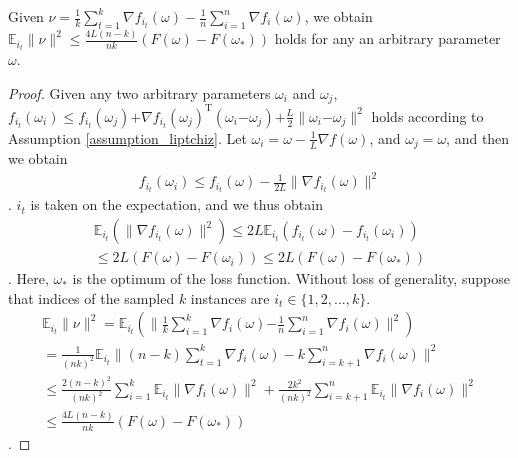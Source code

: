 \documentclass[letterpaper]{article}
\begin{document}
\begin{Lemma}
\label{lemma_nu}
Given $\nu = \frac{1}{k}\sum\limits_{t=1}^k  \nabla f_{i_t}(\omega) - \frac{1}{n}\sum\limits_{i=1}^n \nabla f_i(\omega)$, we obtain
$\mathbb{E}_{i_t}\parallel \nu  \parallel^2 \le \frac{4L(n-k)}{nk}\left(F(\omega) - F(\omega_\ast)\right)$ holds for any an arbitrary parameter $\omega$.
\end{Lemma}
\begin{proof}
Given any two arbitrary parameters $\omega_i$ and $\omega_j$,  $f_{i_t}(\omega_i)\le f_{i_t}(\omega_j)\mathrm{+}\nabla f_{i_t}(\omega_j)^\mathrm{T} (\omega_i\mathrm{-}\omega_j)\mathrm{+}\frac{L}{2}\parallel \omega_i\mathrm{-}\omega_j\parallel^2$ holds according to Assumption  \ref{assumption_liptchiz}. Let $\omega_i = \omega  - \frac{1}{L}\nabla f(\omega)$, and $\omega_j = \omega$, and then we obtain
\begin{equation}
\begin{array}{ll}
f_{i_t}(\omega_i) \le f_{i_t}(\omega)-\frac{1}{2L}\parallel  \nabla f_{i_t}(\omega)   \parallel^2
\end{array} 
\end{equation}.  $i_{t}$ is taken on the expectation, and we thus obtain
\begin{equation}
\begin{array}{ll}
\mathbb{E}_{i_t}\left(\parallel  \nabla f_{i_t}(\omega)   \parallel^2 \right) \le 2L \mathbb{E}_{i_t}\left( f_{i_t}(\omega) - f_{i_t}(\omega_i) \right)   \\
\le 2L (F(\omega) - F(\omega_i) )  \le 2L (F(\omega) - F(\omega_\ast))
\end{array} 
\end{equation}. Here, $\omega_\ast$ is the optimum of the loss function.   Without loss of generality, suppose that indices of the sampled $k$ instances are $i_t\in\{1,2, ..., k\}$.
\begin{equation}
\begin{array}{ll}
\mathbb{E}_{i_t}\parallel \nu  \parallel^2 
= \mathbb{E}_{i_t}\left( \parallel \frac{1}{k}\sum\limits_{i=1}^k  \nabla f_{i}(\omega) \mathrm{-} \frac{1}{n}\sum\limits_{i=1}^n \nabla f_i(\omega) \parallel^2  \right)    \\
= \frac{1}{(nk)^2}  \mathbb{E}_{i_t}\parallel  (n-k)\sum\limits_{t=1}^k \nabla f_{i}(\omega)-k \sum\limits_{i=k+1}^n \nabla f_{i}(\omega) \parallel^2      \\
\le  \frac{2(n-k)^2}{(nk)^2}  \sum\limits_{i=1}^k \mathbb{E}_{i_t} \parallel  \nabla f_{i}(\omega) \parallel^2  + \frac{2k^2}{(nk)^2}  \sum\limits_{i=k+1}^{n} \mathbb{E}_{i_t} \parallel  \nabla f_{i}(\omega) \parallel^2    \\
\le \frac{4L(n-k)}{nk}(F(\omega) - F(\omega_\ast))
\end{array} 
\end{equation}. 
\end{proof}
\end{document}
